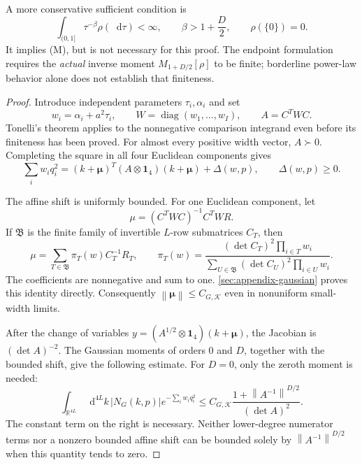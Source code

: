 \documentclass[final,5p,times,twocolumn,numbers,nopreprintline]{elsarticle}
\numberwithin{equation}{section}
\theoremstyle{definition}
\theoremstyle{remark}
\newcommand{\dd}{\mathop{}\!\mathrm d}
\newcommand{\diag}{\operatorname{diag}}
\newcommand{\RR}{\mathbb R}
\newcommand{\one}{\mathbf 1}
\newcommand{\norm}[1]{\left\lVert #1\right\rVert}
\newcommand{\abs}[1]{\left\lvert #1\right\rvert}
\newcommand{\bmu}{\boldsymbol{\mu}}
\begin{document}
A more conservative sufficient condition is
\begin{equation}
 \int_{(0,1]}\tau^{-\beta}\rho(\dd\tau)<\infty,\qquad
 \beta>1+\frac D2,\qquad\rho(\{0\})=0.
 \label{eq:conservative-moment}
\end{equation}
It implies (M), but is not necessary for this proof. The endpoint
formulation requires the \emph{actual} inverse moment
$M_{1+D/2}[\rho]$ to be finite; borderline power-law behavior
alone does not establish that finiteness.

\begin{proof}
Introduce independent parameters \(\tau_i,\alpha_i\) and set
\begin{equation}
 w_i=\alpha_i+a^2\tau_i,\qquad W=\diag(w_1,\ldots,w_I),
 \qquad A=C^TWC .
 \label{eq:width-matrix}
\end{equation}
Tonelli's theorem applies to the nonnegative comparison integrand
even before its finiteness has been proved. For almost every
positive width vector, \(A\succ0\). Completing the square in all
four Euclidean components gives
\begin{equation}
 \sum_iw_iq_i^2
  =(k+\bmu)^T(A\otimes\one_4)(k+\bmu)+\Delta(w,p),
 \qquad \Delta(w,p)\geq0 .
 \label{eq:complete-square}
\end{equation}

The affine shift is uniformly bounded. For one Euclidean component,
let
\[
 \mu=(C^TWC)^{-1}C^TWR.
\]
If \(\mathfrak B\) is the finite family of invertible \(L\)-row
submatrices \(C_T\), then
\begin{equation}
 \mu=\sum_{T\in\mathfrak B}\pi_T(w)C_T^{-1}R_T,\qquad
 \pi_T(w)=
 \frac{(\det C_T)^2\prod_{i\in T}w_i}
      {\sum_{U\in\mathfrak B}(\det C_U)^2\prod_{i\in U}w_i}.
 \label{eq:shift-mixture}
\end{equation}
The coefficients are nonnegative and sum to one.
\ref{sec:appendix-gaussian} proves this identity directly.
Consequently \(\norm{\bmu}\leq C_{G,\mathcal K}\) even in nonuniform
small-width limits.

After the change of variables
\(y=(A^{1/2}\otimes\one_4)(k+\bmu)\), the Jacobian is
\((\det A)^{-2}\). The Gaussian moments of orders \(0\) and \(D\), together with the
bounded shift, give the following estimate. For \(D=0\), only the
zeroth moment is needed:
\begin{equation}
 \int_{\RR^{4L}}\dd^{4L}k\,\abs{N_G(k,p)}
                 e^{-\sum_iw_iq_i^2}
 \leq C_{G,\mathcal K}\frac{1+\norm{A^{-1}}^{D/2}}{(\det A)^2}.
 \label{eq:gaussian-bound}
\end{equation}
The constant term on the right is necessary. Neither lower-degree
numerator terms nor a nonzero bounded affine shift can be bounded
solely by \(\norm{A^{-1}}^{D/2}\) when this quantity tends to zero.


\end{proof}
\end{document}
